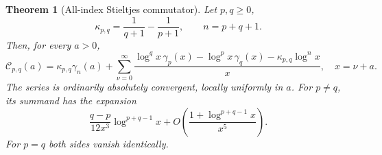 \documentclass[11pt]{article}
\numberwithin{equation}{section}
\newtheorem{theorem}{Theorem}[section]
\theoremstyle{definition}
\begin{document}
\begin{theorem}[All-index Stieltjes commutator]\label{thm:commutator}
Let $p,q\ge0$,
\[
 \kappa_{p,q}=\frac1{q+1}-\frac1{p+1},\qquad n=p+q+1.
\]
Then, for every $a>0$,
\begin{equation}\label{eq:commutator-series}
 \boxed{\displaystyle
 \mathcal C_{p,q}(a)=\kappa_{p,q}\gamma_n(a)+
 \sum_{\nu=0}^\infty
 \frac{\log^q x\,\gamma_p(x)-\log^p x\,\gamma_q(x)
                  -\kappa_{p,q}\log^n x}{x},\quad x=\nu+a.}
\end{equation}
The series is ordinarily absolutely convergent, locally uniformly in $a$.
For $p\ne q$, its summand has the expansion
\begin{equation}\label{eq:commutator-tail}
 \frac{q-p}{12x^3}\log^{p+q-1}x
       +O\!\left(\frac{1+\log^{p+q-1}x}{x^5}\right).
\end{equation}
For $p=q$ both sides vanish identically.
\end{theorem}
\end{document}
